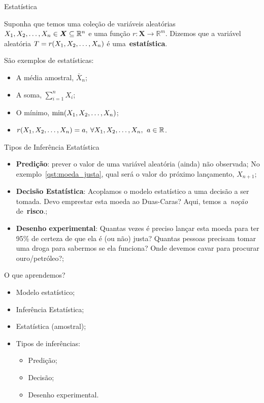 \begin{frame}{Estatística}
\begin{defn}[Estatística]
\label{def:statistic}
 Suponha que temos uma coleção de variáveis aleatórias $X_1, X_2, \ldots, X_n \in \boldsymbol X \subseteq \mathbb{R}^n$ e uma função $r: \boldsymbol X \to \mathbb{R}^m$.
 Dizemos que a variável aleatória $T = r(X_1, X_2, \ldots, X_n)$ é uma~\textbf{estatística}.
\end{defn}
São exemplos de estatísticas:
\begin{itemize}
 \item A média amostral, $\bar{X}_n$;
 \item A soma, $\sum_{i=1}^n X_i$;
 \item O mínimo, $\min(X_1, X_2, \ldots, X_n)$;
 \item $r(X_1, X_2, \ldots, X_n) = a, \: \forall X_1, X_2, \ldots, X_n, \: \, a \in \mathbb{R}$.
\end{itemize}  
\end{frame}
\begin{frame}{Tipos de Inferência Estatística}
\begin{itemize}
 \item \textbf{Predição}: prever o valor de uma variável aleatória (ainda) não observada; No exemplo~\ref{qst:moeda_justa}, qual será o valor do próximo lançamento, $X_{n+1}$;
 \item \textbf{Decisão Estatística}: Acoplamos o modelo estatístico a uma decisão a ser tomada. Devo emprestar esta moeda ao Duas-Caras? Aqui, temos a~\textit{noção} de~\textbf{risco}.;
 \item \textbf{Desenho experimental}: Quantas vezes é preciso lançar esta moeda para ter 95\% de certeza de que ela é (ou não) justa? Quantas pessoas precisam tomar uma droga para sabermos se ela funciona? Onde devemos cavar para procurar ouro/petróleo?;
\end{itemize}
\end{frame}
\begin{frame}{O que aprendemos?}
\begin{itemize}
 \item[\faLightbulbO] Modelo estatístico;
 \item[\faLightbulbO] Inferência Estatística;
 \item[\faLightbulbO] Estatística (amostral);
 \item[\faLightbulbO] Tipos de inferências:
 \begin{itemize}
  \item Predição;
  \item Decisão;
  \item Desenho experimental.
 \end{itemize}
\end{itemize}
\end{frame}
